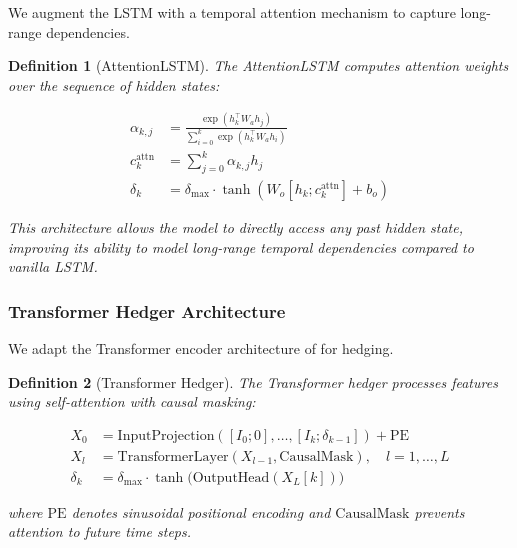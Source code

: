 \documentclass[11pt,oneside]{report}
\newtheorem{definition}{Definition}[chapter]
\begin{document}
We augment the LSTM with a temporal attention mechanism to capture long-range dependencies.

\begin{definition}[AttentionLSTM]
The AttentionLSTM computes attention weights over the sequence of hidden states:

\begin{align}
\alpha_{k,j} &= 
\frac{\exp\left(h_k^\top W_a h_j\right)}
{\sum_{i=0}^{k} \exp\left(h_k^\top W_a h_i\right)} \label{eq:attention_weights} \\
c_k^{\mathrm{attn}} &= \sum_{j=0}^{k} \alpha_{k,j} h_j \label{eq:attention_context} \\
\delta_k &= \delta_{\max} \cdot \tanh\left(W_o [h_k; c_k^{\mathrm{attn}}] + b_o\right) \label{eq:attention_output}
\end{align}

This architecture allows the model to directly access any past hidden state, improving its ability to model long-range temporal dependencies compared to vanilla LSTM.
\end{definition}

\vspace{0.5em}

\subsubsection{Transformer Hedger Architecture}

We adapt the Transformer encoder architecture of \citet{vaswani2017attention} for hedging.

\begin{definition}[Transformer Hedger]
The Transformer hedger processes features using self-attention with causal masking:

\begin{align}
X_0 &= \mathrm{InputProjection}([I_0; 0], \dots, [I_k; \delta_{k-1}]) + \mathrm{PE} \label{eq:transformer_input} \\
X_l &= \mathrm{TransformerLayer}(X_{l-1}, \mathrm{CausalMask}), \quad l = 1, \dots, L \label{eq:transformer_layers} \\
\delta_k &= \delta_{\max} \cdot \tanh\big(\mathrm{OutputHead}(X_L[k])\big) \label{eq:transformer_output}
\end{align}

where $\mathrm{PE}$ denotes sinusoidal positional encoding and $\mathrm{CausalMask}$ prevents attention to future time steps.
\end{definition}
\end{document}
